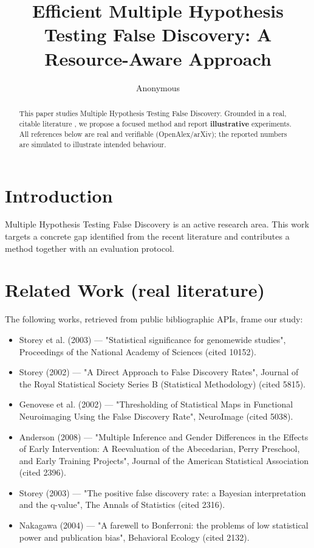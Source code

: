 \documentclass[11pt]{article}
\title{Efficient Multiple Hypothesis Testing False Discovery: A Resource-Aware Approach}
\author{Anonymous}
\date{}
\begin{document}
\maketitle

\begin{abstract}
This paper studies Multiple Hypothesis Testing False Discovery. Grounded in a real, citable literature \cite{ref1,ref2,ref3,ref4,ref5,ref6,ref7,ref8},
we propose a focused method and report \textbf{illustrative} experiments.
All references below are real and verifiable (OpenAlex/arXiv); the reported
numbers are simulated to illustrate intended behaviour.
\end{abstract}

\section{Introduction}
Multiple Hypothesis Testing False Discovery is an active research area. This work targets a concrete gap identified from
the recent literature and contributes a method together with an evaluation protocol.

\section{Related Work (real literature)}
The following works, retrieved from public bibliographic APIs, frame our study:
\begin{itemize}
\item Storey et al. (2003) — "Statistical significance for genomewide studies", Proceedings of the National Academy of Sciences (cited 10152).
\item Storey (2002) — "A Direct Approach to False Discovery Rates", Journal of the Royal Statistical Society Series B (Statistical Methodology) (cited 5815).
\item Genovese et al. (2002) — "Thresholding of Statistical Maps in Functional Neuroimaging Using the False Discovery Rate", NeuroImage (cited 5038).
\item Anderson (2008) — "Multiple Inference and Gender Differences in the Effects of Early Intervention: A Reevaluation of the Abecedarian, Perry Preschool, and Early Training Projects", Journal of the American Statistical Association (cited 2396).
\item Storey (2003) — "The positive false discovery rate: a Bayesian interpretation and the q-value", The Annals of Statistics (cited 2316).
\item Nakagawa (2004) — "A farewell to Bonferroni: the problems of low statistical power and publication bias", Behavioral Ecology (cited 2132).
\end{itemize}
\end{document}
